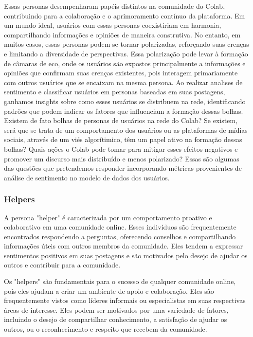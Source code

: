 Essas personas desempenharam papéis distintos na comunidade do Colab, contribuindo para a colaboração e o aprimoramento contínuo da plataforma. Em um mundo ideal, usuários com essas personas coexistiriam em harmonia, compartilhando informações e opiniões de maneira construtiva. No entanto, em muitos casos, essas personas podem se tornar polarizadas, reforçando suas crenças e limitando a diversidade de perspectivas. Essa polarização pode levar à formação de câmaras de eco, onde os usuários são expostos principalmente a informações e opiniões que confirmam suas crenças existentes, pois interagem primariamente com outros usuários que se encaixam na mesma persona. Ao realizar analises de sentimento e classificar usuários em personas baseadas em suas postagens, ganhamos insights sobre como esses usuários se distribuem na rede, identificando padrões que podem indicar os fatores que influenciam a formação dessas bolhas. Existem de fato bolhas de personas de usuários na rede do Colab? Se existem, será que se trata de um comportamento dos usuários ou as plataformas de mídias sociais, através de um viés algorítimico, têm um papel ativo na formação dessas bolhas? Quais ações o Colab pode tomar para mitigar esses efeitos negativos e promover um discurso mais distribuído e menos polarizado? Essas são algumas das questões que pretendemos responder incorporando métricas provenientes de análise de sentimento no modelo de dados dos usuários.

\subsubsection*{Helpers}

A persona "helper" é caracterizada por um comportamento proativo e colaborativo em uma comunidade online. Esses indivíduos são frequentemente encontrados respondendo a perguntas, oferecendo conselhos e compartilhando informações úteis com outros membros da comunidade. Eles tendem a expressar sentimentos positivos em suas postagens e são motivados pelo desejo de ajudar os outros e contribuir para a comunidade.

Os "helpers" são fundamentais para o sucesso de qualquer comunidade online, pois eles ajudam a criar um ambiente de apoio e colaboração. Eles são frequentemente vistos como líderes informais ou especialistas em suas respectivas áreas de interesse. Eles podem ser motivados por uma variedade de fatores, incluindo o desejo de compartilhar conhecimento, a satisfação de ajudar os outros, ou o reconhecimento e respeito que recebem da comunidade.

